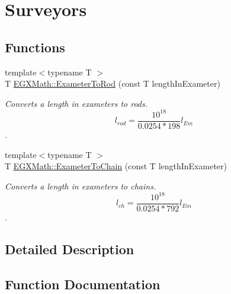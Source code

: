 \hypertarget{group___e_g_x_math-_conversions-_length_conversions-_exameter-_surveyors}{}\section{Surveyors}
\label{group___e_g_x_math-_conversions-_length_conversions-_exameter-_surveyors}
\subsection*{Functions}
\begin{DoxyCompactItemize}
\item 
{\footnotesize template$<$typename T $>$ }\\T \mbox{\hyperlink{group___e_g_x_math-_conversions-_length_conversions-_exameter-_surveyors_ga5d842e19237d7aecc7d5c2428e4ac434}{E\+G\+X\+Math\+::\+Exameter\+To\+Rod}} (const T length\+In\+Exameter)
\begin{DoxyCompactList}\small\item\em Converts a length in exameters to rods. \[ l_{rod}= \frac{10^{18}}{0.0254 * 198} l_{Em} \]. \end{DoxyCompactList}\item 
{\footnotesize template$<$typename T $>$ }\\T \mbox{\hyperlink{group___e_g_x_math-_conversions-_length_conversions-_exameter-_surveyors_ga2d85311f9e75da9c0f753ed578992d10}{E\+G\+X\+Math\+::\+Exameter\+To\+Chain}} (const T length\+In\+Exameter)
\begin{DoxyCompactList}\small\item\em Converts a length in exameters to chains. \[ l_{ch}= \frac{10^{18}}{0.0254 * 792} l_{Em} \]. \end{DoxyCompactList}\end{DoxyCompactItemize}


\subsection{Detailed Description}


\subsection{Function Documentation}
\mbox{\label{group___e_g_x_math-_conversions-_length_conversions-_exameter-_surveyors_ga2d85311f9e75da9c0f753ed578992d10}} 
